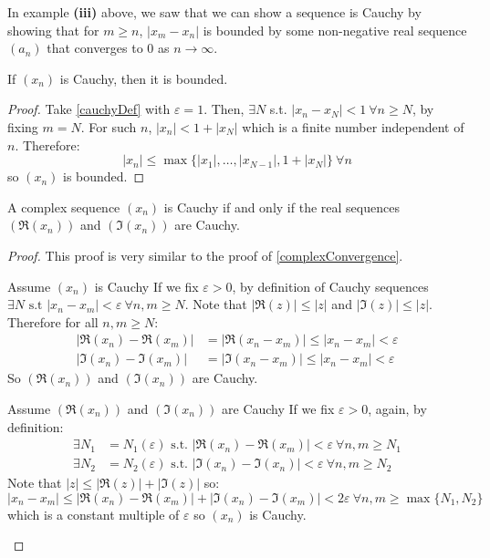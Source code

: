 \documentclass[../main.tex]{subfiles}
\begin{document}
\begin{remark}[Advice]
  In example \textbf{(iii)} above, we saw that we can show a sequence is Cauchy by showing that for $m \geq n$, $|x_m - x_n|$ is bounded by some non-negative real sequence $(a_n)$ that converges to 0 as $n \to \infty$.
\end{remark}
\begin{lemma}
  If $(x_n)$ is Cauchy, then it is bounded.
\end{lemma}
\begin{proof}
  Take \cref{cauchyDef} with $\varepsilon = 1$.
  Then, $\exists N$ s.t. $|x_n - x_N| < 1\ \forall n \geq N$, by fixing $m = N$.
  For such $n$, $|x_n| < 1 + |x_N|$ which is a finite number independent of $n$.
  Therefore:
  \[
    |x_n| \leq \max\{|x_1|, \ldots, |x_{N - 1}|, 1 + |x_N|\}\ \forall n
  \]
  so $(x_n)$ is bounded.
\end{proof}
\begin{lemma}
  A complex sequence $(x_n)$ is Cauchy if and only if the real sequences $(\Re(x_n))$ and $(\Im(x_n))$ are Cauchy.
  \label{complexCauchy}
\end{lemma}
\begin{proof}
  This proof is very similar to the proof of \cref{complexConvergence}.
  \begin{proofdirection}{Assume $(x_n)$ is Cauchy}
    If we fix $\varepsilon > 0$, by definition of Cauchy sequences $\exists N \text{ s.t } |x_n - x_m| < \varepsilon\ \forall n, m \geq N$.
    Note that $|\Re(z)| \leq |z|$ and $|\Im(z)| \leq |z|$.
    Therefore for all $n, m \geq N$:
    \begin{align*}
      |\Re(x_n) - \Re(x_m)| &= |\Re(x_n - x_m)| \leq |x_n - x_m| < \varepsilon \\
      |\Im(x_n) - \Im(x_m)| &= |\Im(x_n - x_m)| \leq |x_n - x_m| < \varepsilon
    \end{align*}
    So $(\Re(x_n))$ and $(\Im(x_n))$ are Cauchy.
  \end{proofdirection}
  \begin{proofdirection}{Assume $(\Re(x_n))$ and $(\Im(x_n))$ are Cauchy}
    If we fix $\varepsilon > 0$, again, by definition:
    \begin{align*}
      \exists N_1 &= N_1(\varepsilon) \text{ s.t. } |\Re(x_n) - \Re(x_m)| < \varepsilon\ \forall n, m \geq N_1 \\
      \exists N_2 &= N_2(\varepsilon) \text{ s.t. } |\Im(x_n) - \Im(x_n)| < \varepsilon\ \forall n, m \geq N_2
    \end{align*}
    Note that $|z| \leq |\Re(z)| + |\Im(z)|$ so:
    \[
      |x_n - x_m| \leq |\Re(x_n) - \Re(x_m)| + |\Im(x_n) - \Im(x_m)| < 2\varepsilon\ \forall n, m \geq \max\{N_1, N_2\}
    \]
    which is a constant multiple of $\varepsilon$ so $(x_n)$ is Cauchy.
  \end{proofdirection}
\end{proof}
\end{document}
